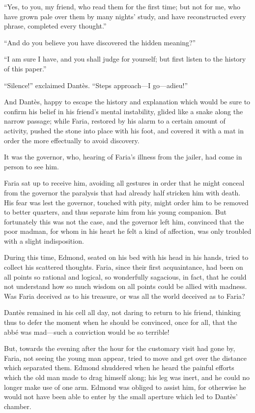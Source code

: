 “Yes, to you, my friend, who read them for the first time; but not for
me, who have grown pale over them by many nights’ study, and have
reconstructed every phrase, completed every thought.”

“And do you believe you have discovered the hidden meaning?”

“I am sure I have, and you shall judge for yourself; but first listen
to the history of this paper.”

“Silence!” exclaimed Dantès. “Steps approach—I go—adieu!”

And Dantès, happy to escape the history and explanation which would be
sure to confirm his belief in his friend’s mental instability, glided
like a snake along the narrow passage; while Faria, restored by his
alarm to a certain amount of activity, pushed the stone into place with
his foot, and covered it with a mat in order the more effectually to
avoid discovery.

It was the governor, who, hearing of Faria’s illness from the jailer,
had come in person to see him.

Faria sat up to receive him, avoiding all gestures in order that he
might conceal from the governor the paralysis that had already half
stricken him with death. His fear was lest the governor, touched with
pity, might order him to be removed to better quarters, and thus
separate him from his young companion. But fortunately this was not the
case, and the governor left him, convinced that the poor madman, for
whom in his heart he felt a kind of affection, was only troubled with a
slight indisposition.

During this time, Edmond, seated on his bed with his head in his hands,
tried to collect his scattered thoughts. Faria, since their first
acquaintance, had been on all points so rational and logical, so
wonderfully sagacious, in fact, that he could not understand how so
much wisdom on all points could be allied with madness. Was Faria
deceived as to his treasure, or was all the world deceived as to Faria?

Dantès remained in his cell all day, not daring to return to his
friend, thinking thus to defer the moment when he should be convinced,
once for all, that the abbé was mad—such a conviction would be so
terrible!

But, towards the evening after the hour for the customary visit had
gone by, Faria, not seeing the young man appear, tried to move and get
over the distance which separated them. Edmond shuddered when he heard
the painful efforts which the old man made to drag himself along; his
leg was inert, and he could no longer make use of one arm. Edmond was
obliged to assist him, for otherwise he would not have been able to
enter by the small aperture which led to Dantès’ chamber.

